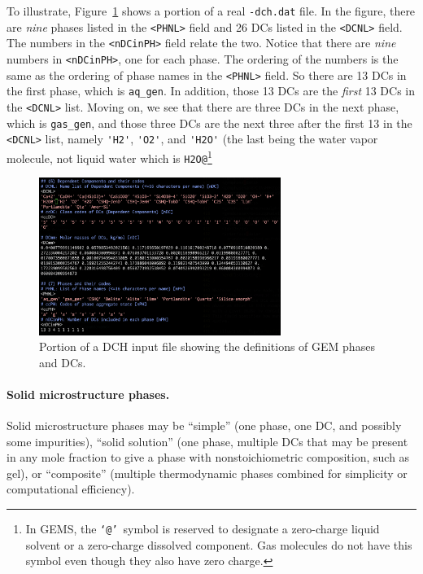 \documentclass{article}
\begin{document}
{To illustrate, Figure~\ref{fig:dchfile} shows a portion of a real \verb!-dch.dat! file.
In the figure, there are \textit{nine} phases listed in the \verb!<PHNL>! field and
26 DCs listed in the \verb!<DCNL>! field.  The numbers in the \verb!<nDCinPH>! field
relate the two.  Notice that there are \textit{nine} numbers in \verb!<nDCinPH>!, one
for each phase. The ordering of the numbers is the same as the ordering of phase
names in the \verb!<PHNL>! field.  So there are 13 DCs in the first phase, which
is \verb!aq_gen!.  In addition, those 13 DCs are the \textit{first} 13 DCs in the
\verb!<DCNL>! list.  Moving on, we see that there are three DCs in the next phase, which
is \verb!gas_gen!, and those three DCs are the next three after the first 13 in the
\verb!<DCNL>! list, namely \verb!'H2'!, \verb!'O2'!, and \verb!'H2O'! (the last being
the water vapor molecule, not liquid water which is \verb!H2O@!\footnote{In GEMS, the
	\makeatletter\texttt{`@'}\makeatother\ symbol is reserved to designate
	a zero-charge liquid solvent or
	a zero-charge dissolved component.  Gas molecules do not have this symbol even though
	they also have zero charge.}

\begin{figure}
	\centering\includegraphics[width=0.7\textwidth]{../Figures/dchfile.png}
	\caption{\label{fig:dchfile} Portion of a DCH input file showing the definitions
		of GEM phases and DCs.}
\end{figure}

\paragraph{Solid microstructure phases.} Solid microstructure
phases may be ``simple'' (one phase, one DC, and possibly
some impurities), ``solid solution'' (one phase, multiple DCs
that may be present in any mole fraction to give a phase
with nonstoichiometric composition, such as  gel),
or ``composite'' (multiple thermodynamic phases combined for
simplicity or computational efficiency).

}
\end{document}
